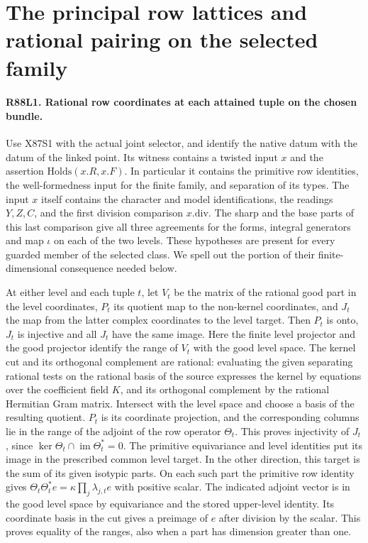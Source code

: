 \section{The principal row lattices and rational pairing on the selected family}

\paragraph{R88L1. Rational row coordinates at each attained tuple on the chosen bundle.}
Use X87S1 with the actual joint selector, and identify the native
datum with the datum of the linked point. Its witness contains a
twisted input $x$ and the assertion $\mathrm{Holds}(x.R,x.F)$.
In particular it contains the primitive row identities, the
well-formedness input for the finite family, and separation of its
types. The input $x$ itself contains the character and model
identifications, the readings $Y,Z,C$, and the first division
comparison $x.\mathrm{div}$. The sharp and the base parts of this last
comparison give all three agreements for the forms, integral
generators and map $\iota$ on each of the two levels. These hypotheses
are present for every guarded member of the selected class. We spell
out the portion of their finite-dimensional consequence needed below.

At either level and each tuple $t$, let $V_t$ be the matrix of
the rational good part in the level coordinates, $P_t$ its
quotient map to the non-kernel coordinates, and $J_t$ the map
from the latter complex coordinates to the level target. Then
$P_t$ is onto, $J_t$ is injective and all $J_t$ have the same
image. Here the finite level projector and the good projector
identify the range of $V_t$ with the good level space. The
kernel cut and its orthogonal complement are rational: evaluating
the given separating rational tests on the rational basis of
the source expresses the kernel by equations over the coefficient
field $K$, and its orthogonal complement by the rational Hermitian
Gram matrix. Intersect with the level space and choose a basis of
the resulting quotient. $P_t$ is its coordinate projection,
and the corresponding columns lie in the range of the adjoint
of the row operator $\Theta_t$. This proves injectivity of $J_t$,
since $\ker\Theta_t\cap\operatorname{im}\Theta_t^*=0$.
The primitive equivariance and level identities put its image in
the prescribed common level target. In the other direction, this
target is the sum of its given isotypic parts. On each such
part the primitive row identity gives
$\Theta_t\Theta_t^* e=\kappa\prod_j\lambda_{j,t}e$ with positive
scalar. The indicated adjoint vector is in the good level space
by equivariance and the stored upper-level identity. Its coordinate
basis in the cut gives a preimage of $e$ after division by the
scalar. This proves equality of the ranges, also when a part has
dimension greater than one.

